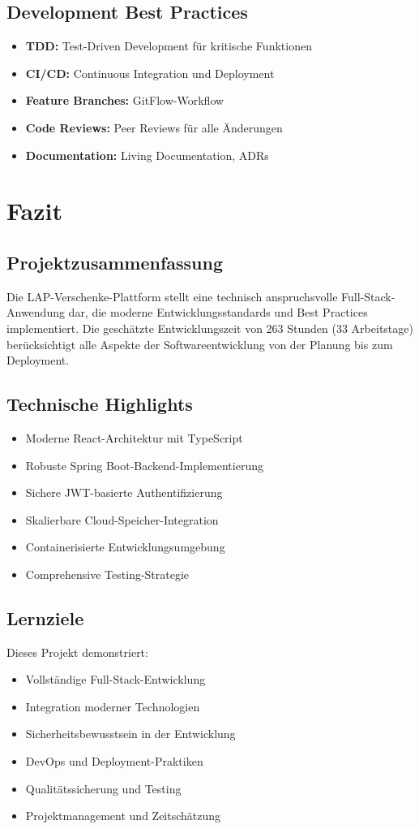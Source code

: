 \documentclass[a4paper,12pt]{article}
\begin{document}
\subsection{Development Best Practices}
\begin{itemize}
    \item \textbf{TDD:} Test-Driven Development für kritische Funktionen
    \item \textbf{CI/CD:} Continuous Integration und Deployment
    \item \textbf{Feature Branches:} GitFlow-Workflow
    \item \textbf{Code Reviews:} Peer Reviews für alle Änderungen
    \item \textbf{Documentation:} Living Documentation, ADRs
\end{itemize}

\section{Fazit}

\subsection{Projektzusammenfassung}
Die LAP-Verschenke-Plattform stellt eine technisch anspruchsvolle Full-Stack-Anwendung dar, die moderne Entwicklungsstandards und Best Practices implementiert. Die geschätzte Entwicklungszeit von 263 Stunden (33 Arbeitstage) berücksichtigt alle Aspekte der Softwareentwicklung von der Planung bis zum Deployment.

\subsection{Technische Highlights}
\begin{itemize}
    \item Moderne React-Architektur mit TypeScript
    \item Robuste Spring Boot-Backend-Implementierung
    \item Sichere JWT-basierte Authentifizierung
    \item Skalierbare Cloud-Speicher-Integration
    \item Containerisierte Entwicklungsumgebung
    \item Comprehensive Testing-Strategie
\end{itemize}

\subsection{Lernziele}
Dieses Projekt demonstriert:
\begin{itemize}
    \item Vollständige Full-Stack-Entwicklung
    \item Integration moderner Technologien
    \item Sicherheitsbewusstsein in der Entwicklung
    \item DevOps und Deployment-Praktiken
    \item Qualitätssicherung und Testing
    \item Projektmanagement und Zeitschätzung
\end{itemize}
\end{document}
